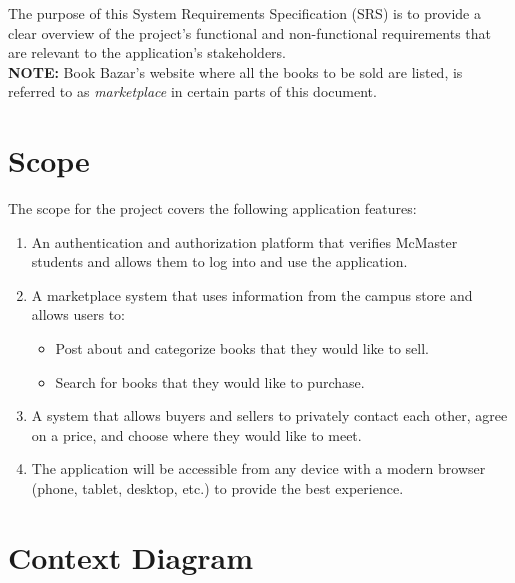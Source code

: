 \documentclass[fullpage]{article}
\newcommand{\be}{\begin{enumerate}}
\newcommand{\ee}{\end{enumerate}}
\newcommand{\bi}{\begin{itemize}}
\newcommand{\ei}{\end{itemize}}
\begin{document}
The purpose of this System Requirements Specification (SRS) is to provide a clear overview of the project’s functional and non-functional requirements that are relevant to the application’s stakeholders.\\ %
\newline
\small{ \textbf{NOTE:} Book Bazar's website where all the books to be sold are listed, is referred to as \textit{marketplace} in certain parts of this document.}
\newpage
\section{Scope}
The scope for the project covers the following application features:
\be
	\item An authentication and authorization platform that verifies McMaster students and allows them to log into and use the application.
	\item A marketplace system that uses information from the campus store and allows users to:
		\bi
			\item Post about and categorize books that they would like to sell.
			\item Search for books that they would like to purchase.
		\ei
	\item A system that allows buyers and sellers to privately contact each other, agree on a price, and choose where they would like to meet.
	\item The application will be accessible from any device with a modern browser (phone, tablet, desktop, etc.) to provide the best experience.
\ee


\section{Context Diagram}
\label{sec:context}
\end{document}
